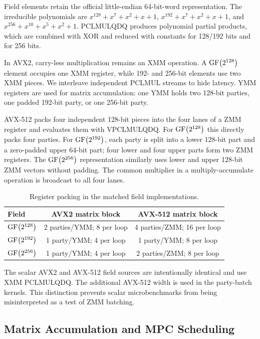 Field elements retain the official little-endian 64-bit-word representation.
The irreducible polynomials are
$x^{128}+x^7+x^2+x+1$,
$x^{192}+x^7+x^2+x+1$, and
$x^{256}+x^{10}+x^5+x^2+1$.
PCLMULQDQ produces polynomial partial products, which are combined with XOR
and reduced with constants  for 128/192 bits and  for
256 bits.

In AVX2, carry-less multiplication remains an XMM operation.  A
$\operatorname{GF}\!\left(2^{128}\right)$ element occupies one XMM register, while 192- and 256-bit
elements use two XMM pieces.  We interleave independent PCLMUL streams to hide
latency.  YMM registers are used for matrix accumulation: one YMM holds two
128-bit parties, one padded 192-bit party, or one 256-bit party.

AVX-512 packs four independent 128-bit pieces into the four lanes of a ZMM
register and evaluates them with VPCLMULQDQ.  For $\operatorname{GF}\!\left(2^{128}\right)$ this directly
packs four parties.  For $\operatorname{GF}\!\left(2^{192}\right)$, each party is split into a lower
128-bit part and a zero-padded upper 64-bit part; four lower and four upper
parts form two ZMM registers.  The $\operatorname{GF}\!\left(2^{256}\right)$ representation similarly
uses lower and upper 128-bit ZMM vectors without padding.  The common
multiplier in a multiply-accumulate operation is broadcast to all four lanes.

\begin{table}[t]
\centering
\caption{Register packing in the matched field implementations.}
\label{tab:packing}
\small
\setlength{\tabcolsep}{5pt}
\begin{tabular}{lcc}
\toprule
Field & AVX2 matrix block & AVX-512 matrix block\\
\midrule
$\operatorname{GF}\!\left(2^{128}\right)$ & 2 parties/YMM; 8 per loop & 4 parties/ZMM; 16 per loop\\
$\operatorname{GF}\!\left(2^{192}\right)$ & 1 party/YMM; 4 per loop & 1 party/YMM; 8 per loop\\
$\operatorname{GF}\!\left(2^{256}\right)$ & 1 party/YMM; 4 per loop & 2 parties/ZMM; 8 per loop\\
\bottomrule
\end{tabular}
\end{table}

The scalar AVX2 and AVX-512 field sources are intentionally identical and use
XMM PCLMULQDQ.  The additional AVX-512 width is used in the party-batch
kernels.  This distinction prevents scalar microbenchmarks from being
misinterpreted as a test of ZMM batching.

\subsection{Matrix Accumulation and MPC Scheduling}
\label{sec:mpc}


